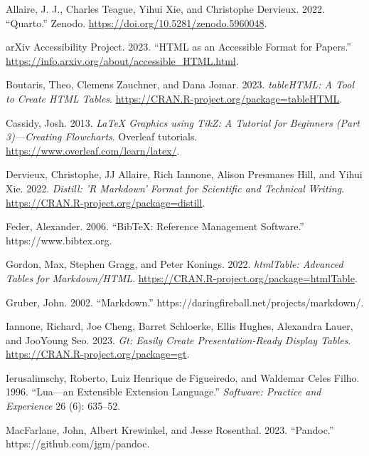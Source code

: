 \hypertarget{refs}{}
\begin{CSLReferences}{1}{0}
\leavevmode{}%
Allaire, J. J., Charles Teague, Yihui Xie, and Christophe Dervieux. 2022. {``Quarto.''} Zenodo. \url{https://doi.org/10.5281/zenodo.5960048}.

\leavevmode{}%
arXiv Accessibility Project. 2023. {``HTML as an Accessible Format for Papers.''} \url{https://info.arxiv.org/about/accessible_HTML.html}.

\leavevmode{}%
Boutaris, Theo, Clemens Zauchner, and Dana Jomar. 2023. \emph{tableHTML: A Tool to Create HTML Tables}. \url{https://CRAN.R-project.org/package=tableHTML}.

\leavevmode{}%
Cassidy, Josh. 2013. \emph{{LaTeX Graphics using TikZ: A Tutorial for Beginners (Part 3)---Creating Flowcharts}}. Overleaf tutorials. \url{https://www.overleaf.com/learn/latex/}.

\leavevmode{}%
Dervieux, Christophe, JJ Allaire, Rich Iannone, Alison Presmanes Hill, and Yihui Xie. 2022. \emph{Distill: 'R Markdown' Format for Scientific and Technical Writing}. \url{https://CRAN.R-project.org/package=distill}.

\leavevmode{}%
Feder, Alexander. 2006. {``BibTeX: Reference Management Software.''} https://www.bibtex.org.

\leavevmode{}%
Gordon, Max, Stephen Gragg, and Peter Konings. 2022. \emph{htmlTable: Advanced Tables for Markdown/HTML}. \url{https://CRAN.R-project.org/package=htmlTable}.

\leavevmode{}%
Gruber, John. 2002. {``Markdown.''} https://daringfireball.net/projects/markdown/.

\leavevmode{}%
Iannone, Richard, Joe Cheng, Barret Schloerke, Ellis Hughes, Alexandra Lauer, and JooYoung Seo. 2023. \emph{Gt: Easily Create Presentation-Ready Display Tables}. \url{https://CRAN.R-project.org/package=gt}.

\leavevmode{}%
Ierusalimschy, Roberto, Luiz Henrique de Figueiredo, and Waldemar Celes Filho. 1996. {``Lua---an Extensible Extension Language.''} \emph{Software: Practice and Experience} 26 (6): 635--52.

\leavevmode{}%
MacFarlane, John, Albert Krewinkel, and Jesse Rosenthal. 2023. {``Pandoc.''} https://github.com/jgm/pandoc.


\end{CSLReferences}
